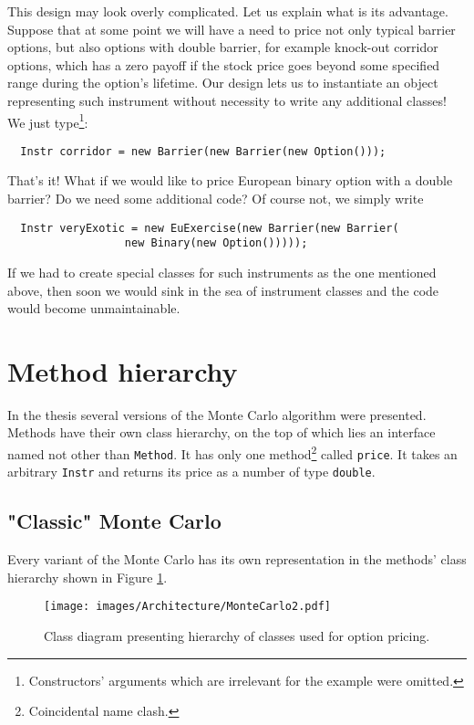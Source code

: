 \documentclass[a4paper,11pt, twoside]{book}
\theoremstyle{definition}
\theoremstyle{remark}
\newcounter{example}[chapter]
\begin{document}
This design may look overly complicated. Let us explain what is its advantage. Suppose that at some point we will have a need to price not only typical barrier options, but also options with double barrier, for example knock-out corridor options, which has a zero payoff if the stock price goes beyond some specified range during the option's lifetime. Our design lets us to instantiate an object representing such instrument without necessity to write any additional classes! We just type\footnote{Constructors' arguments which are irrelevant for the example were omitted.}:
\begin{lstlisting}
  Instr corridor = new Barrier(new Barrier(new Option()));
\end{lstlisting}
That's it! What if we would like to price European binary option with a double barrier? Do we need some additional code? Of course not, we simply write
\begin{lstlisting}
  Instr veryExotic = new EuExercise(new Barrier(new Barrier(
				  new Binary(new Option()))));
\end{lstlisting}
If we had to create special classes for such instruments as the one mentioned above, then soon we would sink in the sea of instrument classes and the code would become unmaintainable.
	
\section{Method hierarchy}
In the thesis several versions of the Monte Carlo algorithm were presented. Methods have their own class hierarchy, on the top of which lies an interface named not other than \texttt{Method}. It has only one method\footnote{Coincidental name clash.} called \texttt{price}. It takes an arbitrary \texttt{Instr} and returns its price as a number of type \texttt{double}.

\subsection{"Classic" Monte Carlo}
Every variant of the Monte Carlo has its own representation in the methods' class hierarchy shown in Figure \ref{fig:arch:MonteCarlo}.
\begin{figure}
\centering
 \texttt{[image: images/Architecture/MonteCarlo2.pdf]}
\caption{Class diagram presenting hierarchy of classes used for option pricing.}
\label{fig:arch:MonteCarlo}
\end{figure}
\end{document}
